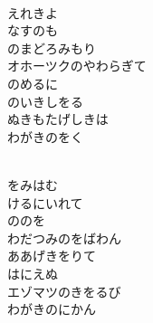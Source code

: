 \documentclass[10pt,b5j]{tarticle} %
\begin{document}
\vspace{1.5em} %
\newcommand{\linespace}{0.5em} %
\newcommand{\blocksize}{0.5\hsize} %
\newcommand{\itemmargin}{3em} %
\begin{enumerate} %
    \setlength{\itemindent}{\itemmargin} %
    \begin{minipage}[c]{\blocksize}
    
        \vspace{\linespace}
        \item~\\
        えれきよ\\
        なすのも\\
        のまどろみもり\\
        オホーツクのやわらぎて\\
        のめるに\\
        のいきしをる\\
        ぬきもたげしきは\\
        わがきのをく
        
    \end{minipage}
    \begin{minipage}[c]{\blocksize}
        
        \vspace{\linespace}
        \item~\\
        をみはむ\\
        けるにいれて\\
        ののを\\
        わだつみのをばわん\\
        ああげきをりて\\
        はにえぬ\\
        エゾマツのきをるび\\
        わがきのにかん
        

\end{minipage}
\end{enumerate}
\end{document}

